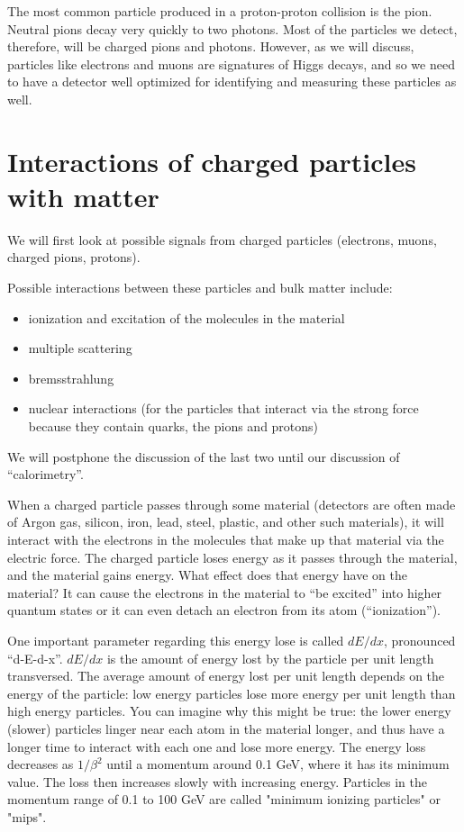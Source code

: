 The most common particle produced in a proton-proton collision is the pion.  Neutral pions decay very quickly to two photons. Most of the particles we detect, therefore, will be charged pions and photons.  However, as we will discuss, particles like electrons and muons are signatures of Higgs decays, and so we need to have a detector well optimized for identifying and measuring these particles as well.




\section{Interactions of charged particles with matter}
We will first look at possible signals from charged particles (electrons, muons, charged pions, protons).

Possible interactions between these particles and bulk matter include:
\begin{itemize}
\item ionization and excitation of the molecules in the material
\item multiple scattering
\item bremsstrahlung
\item nuclear interactions (for the particles that interact via the strong force because they contain quarks, the pions and protons)
\end{itemize}
We will postphone the discussion of the last two until our discussion of ``calorimetry''.

When a charged particle passes through some material (detectors are often made of Argon gas, silicon, iron, lead, steel, plastic, and other such materials), it will interact with the electrons in the molecules that make up that material via the electric force.  The charged particle loses energy as it passes through the material, and the material gains energy.  What effect does that energy have on the material?  It can cause the electrons in the material to ``be excited'' into higher quantum states or it can even detach an electron from its atom (``ionization'').  

One important parameter regarding this energy lose is called $dE/dx$, pronounced ``d-E-d-x''.  $dE/dx$ is the amount of energy lost by the particle per unit length transversed.  The average amount of energy lost per unit length depends on the energy of the particle: low energy particles lose more energy per unit length than high energy particles.  You can imagine why this might be true: the lower energy (slower) particles linger near each atom in the material longer, and thus have a longer time to interact with each one and lose more energy.  The energy loss decreases as $1/\beta^2$ until a momentum around 0.1 GeV, where it has its minimum value.  The loss then increases slowly with increasing energy.  Particles in the momentum range of 0.1 to 100 GeV are called "minimum ionizing particles" or "mips".

